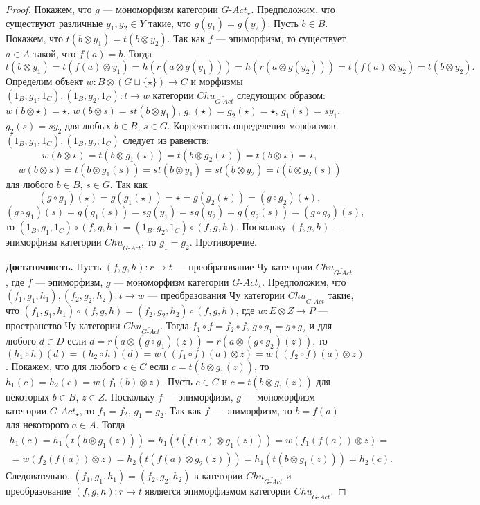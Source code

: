 \documentclass[a4paper,12pt]{article}
\newcommand{\GAct}{G\text{-}Act}
\begin{document}
\begin{proof}
    Покажем, что $g$ --- мономорфизм категории $\GAct_{\star}$. Предположим, что существуют различные $y_1, y_2 \in Y$ такие, что $g(y_1) = g(y_2)$. Пусть $b \in B$. Покажем, что $t(b \otimes y_1) = t(b \otimes y_2)$. Так как $f$ --- эпиморфизм, то существует $a \in A$ такой, что $f(a) = b$. Тогда
    $$
        t(b \otimes y_1) = t(f(a) \otimes y_1) = h(r(a \otimes g(y_1))) = h(r(a \otimes g(y_2))) = t(f(a) \otimes y_2) = t(b \otimes y_2).
    $$
    Определим объект $w: B \otimes (G \sqcup \{\star\}) \to C$ и морфизмы $(1_B,g_1,1_C), (1_B,g_2,1_C): t \to w$ категории $Chu_{\widetilde{\GAct}}$ следующим образом: $w(b \otimes \star) = \star$, $w(b \otimes s) = st(b \otimes y_1)$, $g_1(\star) = g_2(\star) = \star$, $g_1(s) = sy_1$, $g_2(s) = sy_2$ для любых $b \in B$, $s \in G$. Корректность определения морфизмов $(1_B,g_1,1_C), (1_B,g_2,1_C)$ следует из равенств:
    $$
        w(b \otimes \star) = t(b \otimes g_1(\star)) = t(b \otimes g_2(\star)) = t(b \otimes \star) = \star,
    $$
    $$
        w(b \otimes s) = t(b \otimes g_1(s)) = st(b \otimes y_1) = st(b \otimes y_2) = t(b \otimes g_2(s))
    $$
    для любого $b \in B$, $s \in G$. Так как
    $$
        (g \circ g_1)(\star) = g(g_1(\star)) = \star = g(g_2(\star)) = (g \circ g_2)(\star),
    $$
    $$
        (g \circ g_1)(s) = g(g_1(s)) = sg(y_1) = sg(y_2) = g(g_2(s)) = (g \circ g_2)(s),
    $$
    то $(1_B,g_1,1_C) \circ (f,g,h) = (1_B,g_2,1_C) \circ (f,g,h)$. Поскольку $(f,g,h)$ --- эпиморфизм категории $Chu_{\widetilde{\GAct}}$, то $g_1 = g_2$. Противоречие.

    \textbf{Достаточность.} Пусть $(f,g,h): r \to t$ --- преобразование Чу категории $Chu_{\widetilde{\GAct}}$, где $f$ --- эпиморфизм, $g$ --- мономорфизм категории $\GAct_{\star}$. Предположим, что $(f_1,g_1,h_1), (f_2,g_2,h_2): t \to w$ --- преобразования Чу категории $Chu_{\widetilde{\GAct}}$ такие, что $(f_1,g_1,h_1) \circ (f,g,h) = (f_2,g_2,h_2) \circ (f,g,h)$, где $w: E \otimes Z \to P$ --- пространство Чу категории $Chu_{\widetilde{\GAct}}$. Тогда $f_1 \circ f = f_2 \circ f$, $g \circ g_1 = g \circ g_2$ и для любого $d \in D$ если $d = r(a \otimes (g \circ g_1)(z)) = r(a \otimes (g \circ g_2)(z))$, то $(h_1 \circ h)(d) = (h_2 \circ h)(d) = w((f_1 \circ f)(a) \otimes z) = w((f_2 \circ f)(a) \otimes z)$. Покажем, что для любого $c \in C$ если $c = t(b \otimes g_1(z))$, то $h_1(c) = h_2(c) = w(f_1(b) \otimes z)$. Пусть $c \in C$ и $c = t(b \otimes g_1(z))$ для некоторых $b \in B$, $z \in Z$. Поскольку $f$ --- эпиморфизм, $g$ --- мономорфизм категории $\GAct_{\star}$, то $f_1 = f_2$, $g_1 = g_2$. Так как $f$ --- эпиморфизм, то $b = f(a)$ для некоторого $a \in A$. Тогда 
    \begin{multline*}
        h_1(c) = h_1(t(b \otimes g_1(z))) = h_1(t(f(a) \otimes g_1(z))) = w(f_1(f(a)) \otimes z) =\\=
        w(f_2(f(a)) \otimes z) = h_2(t(f(a) \otimes g_2(z))) = h_1(t(b \otimes g_1(z))) = h_2(c).
    \end{multline*}
    Следовательно, $(f_1,g_1,h_1) = (f_2,g_2,h_2)$ в категории $Chu_{\widetilde{\GAct}}$ и преобразование $(f,g,h): r \to t$ является эпиморфизмом категории $Chu_{\widetilde{\GAct}}$.
\end{proof}
\end{document}

